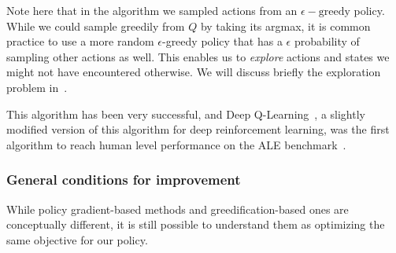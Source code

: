 %
Note here that in the algorithm we sampled actions from an
${\epsilon-\text{greedy}}$ policy. While we could sample greedily from $Q$ by taking its argmax, it is common practice to use a more random $\epsilon$-greedy policy that has a $\epsilon$ probability of sampling other actions as well. This enables us to \emph{explore} actions and states we might not have encountered otherwise. We will discuss briefly the exploration problem in~.

This algorithm has been very successful, and Deep
Q-Learning~\citep{mnih2013playing}, a slightly modified version of this
algorithm for deep reinforcement learning, was the first algorithm to reach human level performance on the ALE benchmark~\citep{bellemare2013arcade}.


\subsubsection{General conditions for improvement} 
While policy gradient-based methods and greedification-based ones are conceptually different, it is still possible to understand them as optimizing the same objective for our policy.

